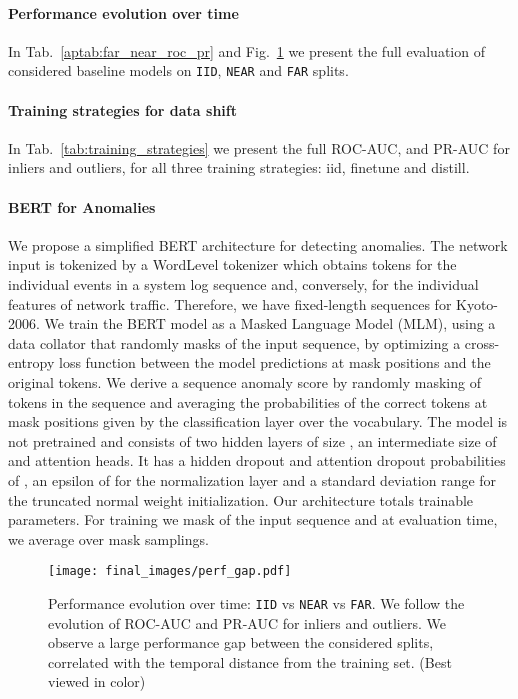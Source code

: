 \documentclass{article}
\begin{document}
\paragraph{Performance evolution over time} In Tab.~\ref{aptab:far_near_roc_pr} and Fig.~\ref{fig:perf_gap} we present the full evaluation of considered baseline models on \texttt{IID}, \texttt{NEAR} and \texttt{FAR} splits. 

\paragraph{Training strategies for data shift} In Tab.~\ref{tab:training_strategies} we present the full ROC-AUC, and PR-AUC for inliers and outliers, for all three training strategies: iid, finetune and distill. 


\paragraph{BERT for Anomalies} We propose a simplified BERT architecture for detecting anomalies. The network input is tokenized by a WordLevel tokenizer which obtains tokens for the individual events in a system log sequence and, conversely, for the individual features of network traffic. Therefore, we have fixed-length sequences for Kyoto-2006. We train the BERT model as a Masked Language Model (MLM), using a data collator that randomly masks  of the input sequence, by optimizing a cross-entropy loss function between the model predictions at mask positions and the original tokens. We derive a sequence anomaly score by randomly masking  of tokens in the sequence and averaging the probabilities of the correct tokens at mask positions given by the classification layer over the vocabulary. The model is not pretrained and consists of two hidden layers of size , an intermediate size of  and  attention heads. It has a hidden dropout and attention dropout probabilities of , an epsilon of  for the normalization layer and a  standard deviation range for the truncated normal weight initialization. Our architecture totals  trainable parameters. For training we mask  of the input sequence and at evaluation time, we average over  mask samplings.

\begin{figure}
    \begin{center}
        \texttt{[image: final\_images/perf\_gap.pdf]}
    \end{center}
    \caption{Performance evolution over time: \texttt{IID} vs \texttt{NEAR} vs \texttt{FAR}.  We follow the evolution of ROC-AUC and PR-AUC for inliers and outliers. We observe a large performance gap between the considered splits, correlated with the temporal distance from the training set. (Best viewed in color)}
    \label{fig:perf_gap}
\end{figure}
\end{document}
